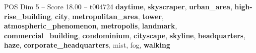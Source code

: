 \begin{textsample}{POS Dim 5 – Score 18.00 – t004724}  \label{ex:f5_pos_015}
\textbf{daytime}, \textbf{skyscraper}, \textbf{urban\_area}, \textbf{high-rise\_building}, \textbf{city}, \textbf{metropolitan\_area}, \textbf{tower}, \textbf{atmospheric\_phenomenon}, \textbf{metropolis}, \textbf{landmark}, \textbf{commercial\_building}, \textbf{condominium}, \textbf{cityscape}, \textbf{skyline}, \textbf{headquarters}, \textbf{haze}, \textbf{corporate\_headquarters}, mist, fog, \textbf{walking}

\end{textsample}
